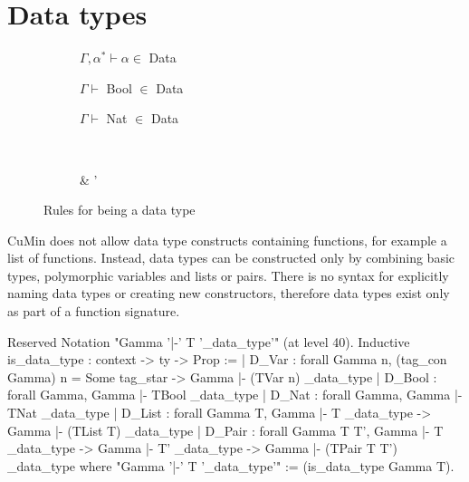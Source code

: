 \documentclass[paper = a4, fleqn, abstract=on, twoside]{scrreprt}
\begin{document}
\section{Data types}
\begin{figure}[H]
	\begin{center}
		\begin{subfigure}{.25 \linewidth}
			\centering
			$\Gamma, \alpha^{*} \vdash \alpha \in$ Data
		\end{subfigure}
		\begin{subfigure}{.25 \linewidth}
			\centering
			$\Gamma \vdash$ Bool $\in$ Data
		\end{subfigure}
		\begin{subfigure}{.25 \linewidth}
			\centering
			$\Gamma \vdash$ Nat $\in$ Data
		\end{subfigure}\\
		\vspace{1em}
		\begin{subfigure}{.375 \linewidth}
			\centering
			      {\Gamma \vdash \tau \in {}}
		\end{subfigure}
		\hspace{.1 \linewidth}
		\begin{subfigure}{.375 \linewidth}
			\centering
			      {\Gamma \vdash \tau \in {} & \Gamma \vdash \tau' \in {}}
		\end{subfigure}
	\end{center}
	\caption{Rules for being a data type}
\end{figure}
CuMin does not allow data type constructs containing functions, for example a list of functions. Instead, data types can be constructed only by combining basic types, polymorphic variables and lists or pairs. There is no syntax for explicitly naming data types or creating new constructors, therefore data types exist only as part of a function signature.
\begin{coqcode}
Reserved Notation "Gamma '|-' T '\is_data_type'" (at level 40).
Inductive is_data_type : context -> ty -> Prop :=
  | D_Var  : forall Gamma n,
               (tag_con Gamma) n  = Some tag_star ->
               Gamma |- (TVar n) \is_data_type
  | D_Bool : forall Gamma, Gamma |- TBool \is_data_type
  | D_Nat  : forall Gamma, Gamma |- TNat \is_data_type
  | D_List : forall Gamma T,
               Gamma |- T \is_data_type ->
               Gamma |- (TList T) \is_data_type
  | D_Pair : forall Gamma T T', 
               Gamma |- T \is_data_type ->
               Gamma |- T' \is_data_type ->
               Gamma |- (TPair T T') \is_data_type
where "Gamma '|-' T '\is_data_type'" := (is_data_type Gamma T).
\end{coqcode}
\end{document}
